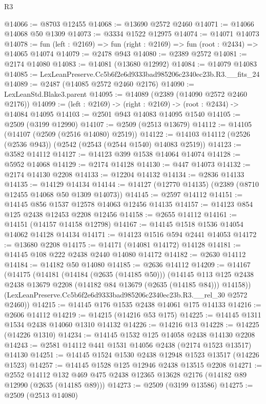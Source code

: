 \begin{lexlean}{R3}
\begin{coremodule}
@14066 := @8703 @12455
@14068 := @13690 @2572 @2460
@14071 := @14066 @14068 @50 @1309
@14073 := @3334 @1522 @12975
@14074 := @14071 @14073
@14078 := fun (left : @2169) => fun (right : @2169) => fun (root : @2434) => @14065 @14074
@14079 := @2478 @943
@14080 := @2389 @2572
@14081 := @2174 @14080
@14083 := @14081 (@13680 @12992)
@14084 := @14079 @14083
@14085 := LexLeanPreserve.Cc5b6f2e6d9333bad985206c2340ec23b.R3.__fits_24
@14089 := @2487 (@14085 @2572 @2460 @2176)
@14090 := LexLeanStd.Blake3.parent
@14095 := @14089 (@2389 (@14090 @2572 @2460 @2176))
@14099 := (left : @2169) -> (right : @2169) -> (root : @2434) -> @14084 @14095
@14103 := @2501 @943 @14083 @14095 @1540
@14105 := @2509 (@3199 @12990)
@14107 := @2509 (@2513 @13679)
@14112 := @14105 (@14107 (@2509 (@2516 @14080) @2519))
@14122 := @14103 @14112 (@2526 (@2536 @943)) (@2542 (@2543 (@2544 @1540) @14083 @2519))
@14123 := @3582 @14112
@14127 := @14123 @399 @1538 @14064 @14074
@14128 := @5952 @14068
@14129 := @2174 @14128
@14130 := @447 @14073
@14132 := @2174 @14130 @2208
@14133 := @12204 @14132
@14134 := @2836 @14133
@14135 := @14129 @14134
@14144 := @14127 (@12770 @14135) (@2389 (@8710 @12455 @14068 @50 @1309 @14073))
@14145 := @2597 @14112
@14151 := @14145 @856 @1537 @12578 @14063 @12456 @14135
@14157 := @14123 @854 @125 @2438 @12453 @2208 @12456
@14158 := @2655 @14112
@14161 := @14151 (@14157 @14158 @12798)
@14167 := @14145 @1518 @1536 @14054 @14062 @14128 @14134
@14171 := @14123 @1516 @594 @2441 @14053
@14172 := @13680 @2208
@14175 := @14171 (@14081 @14172) @14128
@14181 := @14145 @108 @222 @2438 @2440 @14080 @14172
@14182 := @2630 @14112
@14184 := @14182 @50 @14080
@14185 := @2636 @14112
@14209 := @14167
    (@14175
      (@14181
        (@14184 (@2635 (@14185 @50)))
        (@14145 @113 @125 @2438 @2438 @13679 @2208 (@14182 @84 @13679 (@2635 (@14185 @84))) @14158))
      (LexLeanPreserve.Cc5b6f2e6d9333bad985206c2340ec23b.R3.__rel_30 @2572 @2460))
@14215 := @14145 @176 @1535 @2438 @14061 @175 @14133
@14216 := @2606 @14112
@14219 := @14215 (@14216 @53 @175)
@14225 := @14145 @1311 @1534 @2438 @14060 @1310 @14132
@14226 := @14216 @13
@14228 := @14225 (@14226 @1310)
@14234 := @14145 @1532 @125 @14058 @2438 @14130 @2208
@14243 := @2581 @14112 @441 @1531 @14056 @2438 (@2174 @1523 @13517) @14130
@14251 := @14145 @1524 @1530 @2438 @12948 @1523 @13517 (@14226 @1523)
@14257 := @14145 @1528 @125 @12946 @2438 @13515 @2208
@14271 := @2552
    @14112
    @132
    @469
    @475
    @2438
    @12365
    @13628
    @2176
    (@14182 @89 @12990 (@2635 (@14185 @89)))
@14273 := @2509 (@3199 @13586)
@14275 := @2509 (@2513 @14080)

\end{coremodule}
\end{lexlean}
